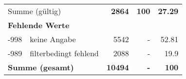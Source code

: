 \begin{longtable}{lXrrr}
     \midrule
     \multicolumn{2}{l}{Summe (gültig)} &
       \textbf{\num{2864}} &
     \textbf{100} &
       \textbf{\num[round-mode=places,round-precision=2]{27,29}} \\
     \multicolumn{5}{l}{\textbf{Fehlende Werte}}\\
       -998 &
       keine Angabe &
         \num{5542} &
        - &
         \num[round-mode=places,round-precision=2]{52,81} \\
       -989 &
       filterbedingt fehlend &
         \num{2088} &
        - &
         \num[round-mode=places,round-precision=2]{19,9} \\
     \midrule
     \multicolumn{2}{l}{\textbf{Summe (gesamt)}} &
          \textbf{\num{10494}} &
        \textbf{-} &
        \textbf{100} \\
     \bottomrule
     \end{longtable}
     

